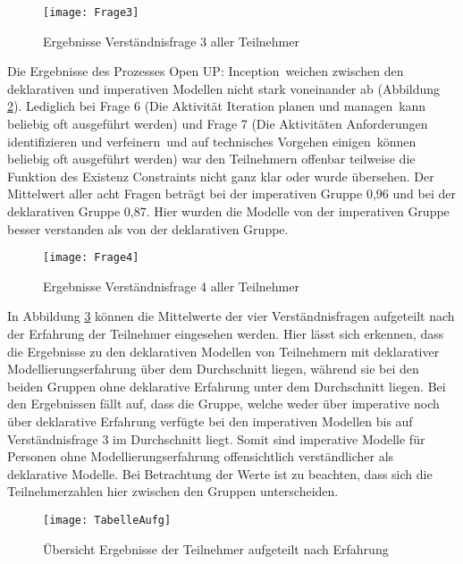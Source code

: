 \begin{figure}[htp]
\begin{center}
  \texttt{[image: Frage3]} %
  \caption{Ergebnisse Verständnisfrage 3 aller Teilnehmer}
  \label{fig:Frage3}
\end{center}
\end{figure}

Die Ergebnisse des Prozesses \grqq Open UP: Inception\grqq \ weichen zwischen den deklarativen und imperativen Modellen nicht stark voneinander ab (Abbildung \ref{fig:Frage4}). \newline
Lediglich bei Frage 6 (\grqq Die Aktivität \grqq Iteration planen und managen\grqq \ kann beliebig oft ausgeführt werden\grqq) und Frage 7 (\grqq Die Aktivitäten \grqq Anforderungen identifizieren und verfeinern\grqq \ und \grqq auf technisches Vorgehen einigen\grqq \ können beliebig oft ausgeführt werden) war den Teilnehmern offenbar teilweise die Funktion des Existenz Constraints nicht ganz klar oder wurde übersehen.\newline
Der Mittelwert aller acht Fragen beträgt bei der imperativen Gruppe 0,96 und bei der deklarativen Gruppe 0,87. Hier wurden die Modelle von der imperativen Gruppe besser verstanden als von der deklarativen Gruppe. \newline


\begin{figure}[htp]
\begin{center}
  \texttt{[image: Frage4]} %
  \caption{Ergebnisse Verständnisfrage 4 aller Teilnehmer}
  \label{fig:Frage4}
\end{center}
\end{figure}

In Abbildung \ref{fig:TabelleAufg} können die Mittelwerte der vier Verständnisfragen aufgeteilt nach der Erfahrung der Teilnehmer eingesehen werden. Hier lässt sich erkennen, dass die Ergebnisse zu den deklarativen Modellen von Teilnehmern mit deklarativer Modellierungserfahrung über dem Durchschnitt liegen, während sie bei den beiden Gruppen ohne deklarative Erfahrung unter dem Durchschnitt liegen. \newline
Bei den Ergebnissen fällt auf, dass die Gruppe, welche weder über imperative noch über deklarative Erfahrung verfügte bei den imperativen Modellen bis auf Verständnisfrage 3 im Durchschnitt liegt. Somit sind imperative Modelle für Personen ohne Modellierungserfahrung offensichtlich verständlicher als deklarative Modelle. Bei Betrachtung der Werte ist zu beachten, dass sich die Teilnehmerzahlen hier zwischen den Gruppen unterscheiden.\newline
\begin{figure}[htp]
\begin{center}
  \texttt{[image: TabelleAufg]} %
  \caption{Übersicht Ergebnisse der Teilnehmer aufgeteilt nach Erfahrung}
  \label{fig:TabelleAufg}
\end{center}
\end{figure}




